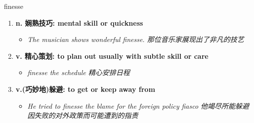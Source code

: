 
\begin{frame}
{\huge finesse}
\begin{center}
\begin{enumerate}\Large
  \item \textbf{n. 娴熟技巧: mental skill or quickness}
  \begin{itemize}
    \item \em{\Large{The musician shows wonderful finesse. 那位音乐家展现出了非凡的技艺}}
  \end{itemize}
  \item \textbf{v. 精心策划: to plan out usually with subtle skill or care}
  \begin{itemize}
    \item \em{\Large{finesse the schedule 精心安排日程}}
  \end{itemize}
  \item \textbf{v.(巧妙地)躲避: to get or keep away from}
  \begin{itemize}
    \item \em{\Large{He tried to finesse the blame for the foreign policy fiasco 他竭尽所能躲避因失败的对外政策而可能遭到的指责}}
  \end{itemize}
\end{enumerate}
\end{center}
\end{frame}
